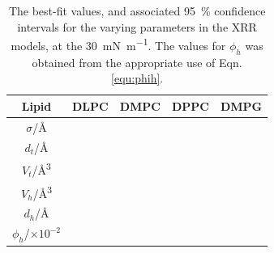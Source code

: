\documentclass[amsmath,amssymb,twocolumn,superscriptaddress]{revtex4-1}
\begin{document}
\begin{table}
    \caption{\label{tab:liptab} The best-fit values, and associated \SI{95}{\percent} confidence intervals for the varying parameters in the XRR models, at the \SI{30}{\milli\newton\per\meter}. The values for $\phi_h$ was obtained from the appropriate use of Eqn. \ref{equ:phih}.}
  \begin{ruledtabular}
    \begin{tabular*}{\textwidth}{ccccc}
    Lipid & DLPC & DMPC & DPPC & DMPG \\
    \hline
    $\sigma$/\si{\angstrom} &  &  &  &  \\
    $d_t$/\si{\angstrom} &  &  &  &  \\
    \hline
    $V_t$/\si{\cubic\angstrom} &  &  &  &  \\
    $V_h$/\si{\cubic\angstrom} &  &  &  &  \\
    $d_h$/\si{\angstrom} &  &  &  &  \\
    \hline
    $\phi_h$/$\times10^{-2}$ &  &  &  &  \\
    \end{tabular*}
  \end{ruledtabular}
\end{table}
%
\end{document}
